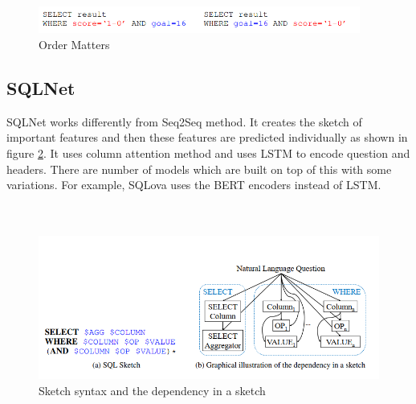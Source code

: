 \documentclass[12pt]{article}
\begin{document}
\begin{figure}[H]
    \includegraphics[width=300pt]{OrderMatters}
    \caption{Order Matters}
    \label{fig:Order Matters}
\end{figure}

\subsection{SQLNet}
SQLNet \cite{xu2017sqlnet} works differently from Seq2Seq method. It creates the sketch of important features and then these features are predicted individually as shown in figure \ref{sqlsketch}. It uses column attention method and uses LSTM to encode question and headers. There are number of models which are built on top of this with some variations. For example, SQLova \cite{hwang2019comprehensive} uses the BERT encoders instead of LSTM. 
\\
\\
\\
\begin{figure}[H]
    \includegraphics[width=400pt]{sqlsketch}
    \caption{Sketch syntax and the dependency in a sketch}
    \label{sqlsketch}
\end{figure}
\end{document}
